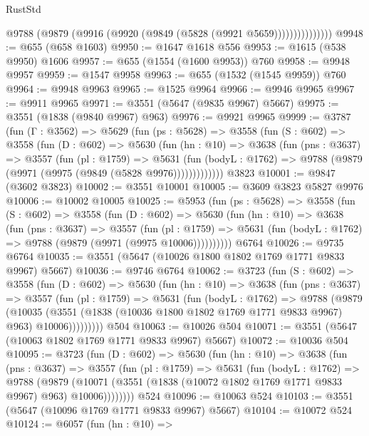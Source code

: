 \begin{lexlean}{RustStd}
\begin{coremodule}
                    @9788 (@9879 (@9916 (@9920 (@9849 (@5828 (@9921 @5659)))))))))))))))
@9948 := @655 (@658 @1603)
@9950 := @1647 @1618 @556
@9953 := @1615 (@538 @9950) @1606
@9957 := @655 (@1554 (@1600 @9953)) @760
@9958 := @9948 @9957
@9959 := @1547 @9958
@9963 := @655 (@1532 (@1545 @9959)) @760
@9964 := @9948 @9963
@9965 := @1525 @9964
@9966 := @9946 @9965
@9967 := @9911 @9965
@9971 := @3551 (@5647 (@9835 @9967) @5667)
@9975 := @3551 (@1838 (@9840 @9967) @963)
@9976 := @9921 @9965
@9999 := @3787
    (fun (Γ : @3562) =>
    @5629
      (fun (ps : @5628) =>
      @3558
        (fun (S : @602) =>
        @3558
          (fun (D : @602) =>
          @5630
            (fun (hn : @10) =>
            @3638
              (fun (pns : @3637) =>
              @3557
                (fun (pl : @1759) =>
                @5631
                  (fun (bodyL : @1762) =>
                  @9788 (@9879 (@9971 (@9975 (@9849 (@5828 @9976)))))))))))))
    @3823
@10001 := @9847 (@3602 @3823)
@10002 := @3551 @10001
@10005 := @3609 @3823 @5827 @9976
@10006 := @10002 @10005
@10025 := @5953
    (fun (ps : @5628) =>
    @3558
      (fun (S : @602) =>
      @3558
        (fun (D : @602) =>
        @5630
          (fun (hn : @10) =>
          @3638
            (fun (pns : @3637) =>
            @3557
              (fun (pl : @1759) =>
              @5631 (fun (bodyL : @1762) => @9788 (@9879 (@9971 (@9975 @10006))))))))))
    @6764
@10026 := @9735 @6764
@10035 := @3551 (@5647 (@10026 @1800 @1802 @1769 @1771 @9833 @9967) @5667)
@10036 := @9746 @6764
@10062 := @3723
    (fun (S : @602) =>
    @3558
      (fun (D : @602) =>
      @5630
        (fun (hn : @10) =>
        @3638
          (fun (pns : @3637) =>
          @3557
            (fun (pl : @1759) =>
            @5631
              (fun (bodyL : @1762) =>
              @9788
                (@9879
                  (@10035
                    (@3551 (@1838 (@10036 @1800 @1802 @1769 @1771 @9833 @9967) @963) @10006)))))))))
    @504
@10063 := @10026 @504
@10071 := @3551 (@5647 (@10063 @1802 @1769 @1771 @9833 @9967) @5667)
@10072 := @10036 @504
@10095 := @3723
    (fun (D : @602) =>
    @5630
      (fun (hn : @10) =>
      @3638
        (fun (pns : @3637) =>
        @3557
          (fun (pl : @1759) =>
          @5631
            (fun (bodyL : @1762) =>
            @9788
              (@9879
                (@10071 (@3551 (@1838 (@10072 @1802 @1769 @1771 @9833 @9967) @963) @10006))))))))
    @524
@10096 := @10063 @524
@10103 := @3551 (@5647 (@10096 @1769 @1771 @9833 @9967) @5667)
@10104 := @10072 @524
@10124 := @6057
    (fun (hn : @10) =>

\end{coremodule}
\end{lexlean}
